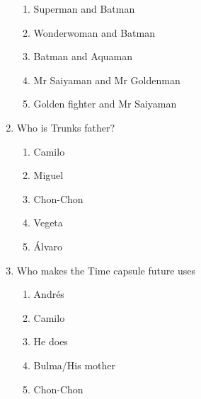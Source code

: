\documentclass[letterpaper,addpoints,answers,twocolumn,10pt]{exam}
\begin{document}
\begin{enumerate}[leftmargin=.2in]
\begin{enumerate}[noitemsep,leftmargin=0in]
\item  Superman and Batman
\item  Wonderwoman and Batman
\item  Batman and Aquaman
\item  Mr Saiyaman and Mr Goldenman
\item  Golden fighter and Mr Saiyaman


\end{enumerate}



\item  Who is Trunks father?


\begin{enumerate}[noitemsep,leftmargin=0in]


\item  Camilo
\item  Miguel
\item  Chon-Chon
\item  Vegeta
\item  Álvaro


\end{enumerate}



\item  Who makes the Time capsule future uses


\begin{enumerate}[noitemsep,leftmargin=0in]


\item  Andrés
\item  Camilo
\item  He does
\item  Bulma/His mother
\item  Chon-Chon


\end{enumerate}



\end{enumerate}
\end{document}
